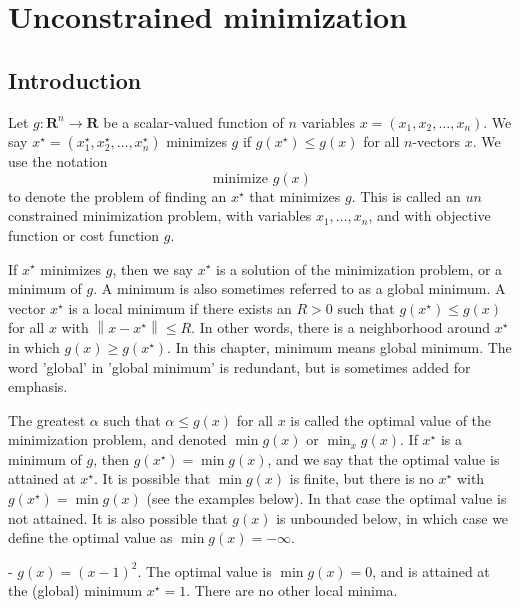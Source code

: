 \chapter{Unconstrained minimization}

\section{Introduction}

Let $ g: \mathbf{R}^{n} \rightarrow \mathbf{R} $ be a scalar-valued function of $ n $ variables $ x=\left(x_{1}, x_{2}, \ldots, x_{n}\right) . $ We say $ x^{\star}=\left(x_{1}^{\star}, x_{2}^{\star}, \ldots, x_{n}^{\star}\right) $ minimizes $ g $ if $ g\left(x^{\star}\right) \leq g(x) $ for all $ n $-vectors $ x $. We use the notation
$$
\text { minimize } g(x)
$$
to denote the problem of finding an $ x^{\star} $ that minimizes $ g $. This is called an $ u n $ constrained minimization problem, with variables $ x_{1}, \ldots, x_{n} $, and with objective function or cost function $ g $.

If $ x^{\star} $ minimizes $ g $, then we say $ x^{\star} $ is a solution of the minimization problem, or a minimum of $ g . $ A minimum is also sometimes referred to as a global minimum. A vector $ x^{\star} $ is a local minimum if there exists an $ R>0 $ such that $ g\left(x^{\star}\right) \leq g(x) $ for all $ x $ with $ \left\|x-x^{\star}\right\| \leq R $. In other words, there is a neighborhood around $ x^{\star} $ in which $ g(x) \geq g\left(x^{\star}\right) $. In this chapter, minimum means global minimum. The word 'global' in 'global minimum' is redundant, but is sometimes added for emphasis.

The greatest $ \alpha $ such that $ \alpha \leq g(x) $ for all $ x $ is called the optimal value of the minimization problem, and denoted
$ \min g(x) $
or $ \min _{x} g(x) $. If $ x^{\star} $ is a minimum of $ g $, then $ g\left(x^{\star}\right)=\min g(x) $, and we say that the optimal value is attained at $ x^{\star} $. It is possible that $ \min g(x) $ is finite, but there is no $ x^{\star} $ with $ g\left(x^{\star}\right)=\min g(x) $ (see the examples below). In that case the optimal value is not attained. It is also possible that $ g(x) $ is unbounded below, in which case we define the optimal value as $ \min g(x)=-\infty $.

\begin{example}
    - $ g(x)=(x-1)^{2} $. The optimal value is $ \min g(x)=0 $, and is attained at the (global) minimum $ x^{\star}=1 $. There are no other local minima.
\end{example}

